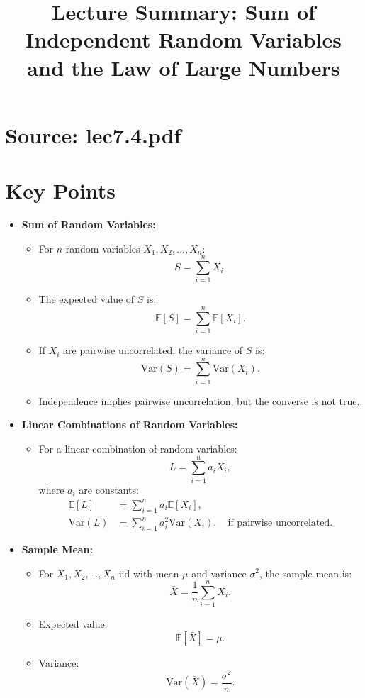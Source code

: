 \documentclass{article}
\title{Lecture Summary: Sum of Independent Random Variables and the Law of Large Numbers}
\author{}
\date{}
\begin{document}
\maketitle

\section*{Source: lec7.4.pdf}

\section*{Key Points}

\begin{itemize}
  \item \textbf{Sum of Random Variables:}
    \begin{itemize}
      \item For $n$ random variables $X_1, X_2, \dots, X_n$:
        \[
          S = \sum_{i=1}^n X_i.
        \]
      \item The expected value of $S$ is:
        \[
          \mathbb{E}[S] = \sum_{i=1}^n \mathbb{E}[X_i].
        \]
      \item If $X_i$ are pairwise uncorrelated, the variance of $S$ is:
        \[
          \text{Var}(S) = \sum_{i=1}^n \text{Var}(X_i).
        \]
      \item Independence implies pairwise uncorrelation, but the converse is not true.
    \end{itemize}

  \item \textbf{Linear Combinations of Random Variables:}
    \begin{itemize}
      \item For a linear combination of random variables:
        \[
          L = \sum_{i=1}^n a_i X_i,
        \]
        where $a_i$ are constants:
        \begin{align*}
          \mathbb{E}[L] &= \sum_{i=1}^n a_i \mathbb{E}[X_i], \\
          \text{Var}(L) &= \sum_{i=1}^n a_i^2 \text{Var}(X_i), \quad \text{if pairwise uncorrelated}.
        \end{align*}
    \end{itemize}

  \item \textbf{Sample Mean:}
    \begin{itemize}
      \item For $X_1, X_2, \dots, X_n$ iid with mean $\mu$ and variance $\sigma^2$, the sample mean is:
        \[
          \bar{X} = \frac{1}{n} \sum_{i=1}^n X_i.
        \]
      \item Expected value:
        \[
          \mathbb{E}[\bar{X}] = \mu.
        \]
      \item Variance:
        \[
          \text{Var}(\bar{X}) = \frac{\sigma^2}{n}.
        \]
    \end{itemize}


\end{itemize}
\end{document}
